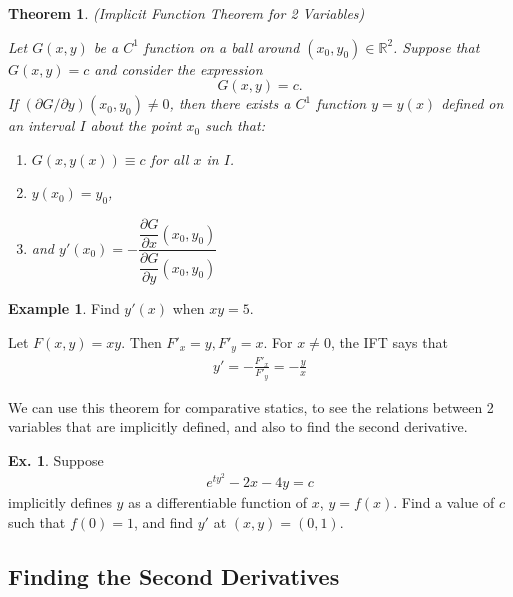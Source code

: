 \documentclass[10pt,a4paper]{book}
\newtheorem{theorem}{Theorem}[section]
\theoremstyle{definition}\newtheorem{definition}{Definition}
\theoremstyle{definition}\newtheorem{fact}{Fact}
\theoremstyle{definition}\newtheorem{ex}{Ex.}
\theoremstyle{definition}\newtheorem{project}{Project}
\theoremstyle{definition}\newtheorem{problem}{Problem}
\theoremstyle{definition}\newtheorem{example}{Example}
\numberwithin{theorem}{chapter}
\numberwithin{corollary}{chapter}
\numberwithin{assumption}{chapter}
\numberwithin{definition}{chapter}
\numberwithin{prop}{chapter}
\numberwithin{notation}{chapter}
\numberwithin{problem}{chapter}
\numberwithin{example}{chapter}
\numberwithin{fact}{chapter}
\numberwithin{ex}{chapter}
\newenvironment{ftheorem}
{\begin{mdframed}\begin{theorem}}
		{\end{theorem}\end{mdframed}}
\def\R{\mathbb R}
\def\R{\mathbb R}
\begin{document}
	\begin{ftheorem}
		\label{theo:implicit_func}(Implicit Function Theorem for 2 Variables)
		
		Let $G(x,y)$ be a $C^1$ function on a ball around $(x_0,y_0) \in \R^2$. Suppose that $G(x,y) = c$ and consider the expression
		\begin{equation*}
			G(x,y) = c.
		\end{equation*}
		If $(\partial G/\partial y)(x_0,y_0) \neq 0$, then there exists a $C^1$ function $y=y(x)$ defined on an interval $I$ about the point $x_0$ such that:
		\begin{enumerate}
			\item $G(x, y(x)) \equiv c$ for all $x$ in $I$.
			\item $y(x_0) = y_0$,
			\item and $y'(x_0) = - \dfrac{\dfrac{\partial G}{\partial x} (x_0,y_0)}{\dfrac{\partial G}{\partial y} (x_0, y_0)}$
		\end{enumerate}
	\end{ftheorem}
	
	\begin{example}
		Find $y'(x)$ when $xy=5$.
		
		
		Let $F(x,y) = xy$. Then $F'_x = y, F'_y = x$. For $x\neq 0$, the IFT says that
		\begin{align*}
			y' = - \frac{F'_x}{F'_y} = - \frac{y}{x} 
		\end{align*}
	\end{example}
	
	We can use this theorem for comparative statics, to see the relations between 2 variables that are implicitly defined, and also to find the second derivative.
	
	\begin{ex}
		Suppose
		\begin{align*}
			e^{t y^2} - 2x - 4y = c 
		\end{align*}
		implicitly defines $y$ as a differentiable function of $x$, $y=f(x)$. Find a value of $c$ such that $f(0)=1$, and find $y'$ at $(x,y) = (0,1)$.
	\end{ex}
	
	\subsection{Finding the Second Derivatives}
	
\end{document}
